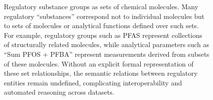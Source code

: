 \begin{figure}[!ht]
	\centering                                                                                                                                                                                                                                                                                                                                                                                                           
	\caption{Regulatory substance groups as sets of chemical molecules.
		Many regulatory “substances” correspond not to individual molecules but to sets of molecules or analytical functions defined over such sets. For example, regulatory groups such as PFAS represent collections of structurally related molecules, while analytical parameters such as “Sum PFOS + PFBA” represent measurements derived from subsets of these molecules. Without an explicit formal representation of these set relationships, the semantic relations between regulatory entities remain undefined, complicating interoperability and automated reasoning across datasets.} \label{fig:regulatory_groups}                                                                                                                                                                                                                                                                                                                                                                  
\end{figure}   